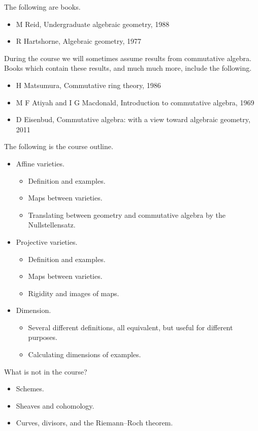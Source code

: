 The following are books.
\begin{itemize}
\item M Reid, Undergraduate algebraic geometry, 1988
\item R Hartshorne, Algebraic geometry, 1977
\end{itemize}
During the course we will sometimes assume results from commutative algebra. Books which contain these results, and much much more, include the following.
\begin{itemize}
\item H Matsumura, Commutative ring theory, 1986
\item M F Atiyah and I G Macdonald, Introduction to commutative algebra, 1969
\item D Eisenbud, Commutative algebra: with a view toward algebraic geometry, 2011
\end{itemize}
The following is the course outline.
\begin{itemize}
\item Affine varieties.
\begin{itemize}
\item Definition and examples.
\item Maps between varieties.
\item Translating between geometry and commutative algebra by the Nullstellensatz.
\end{itemize}
\item Projective varieties.
\begin{itemize}
\item Definition and examples.
\item Maps between varieties.
\item Rigidity and images of maps.
\end{itemize}
\item Dimension.
\begin{itemize}
\item Several different definitions, all equivalent, but useful for different purposes.
\item Calculating dimensions of examples.
\end{itemize}
\end{itemize}
What is not in the course?
\begin{itemize}
\item Schemes.
\item Sheaves and cohomology.
\item Curves, divisors, and the Riemann–Roch theorem.
\end{itemize}

